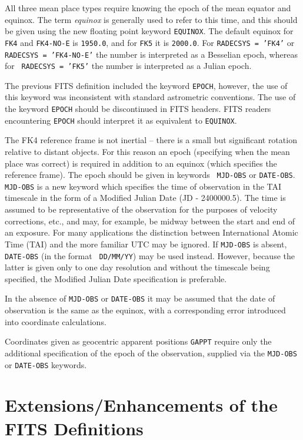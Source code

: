 All three mean place types require knowing the epoch of the mean equator and
equinox.  The term {\it equinox} is generally used to refer to this time, and
this should be given using the new floating point keyword {\tt EQUINOX}. The
default equinox for {\tt FK4} and {\tt FK4-NO-E} is {\tt 1950.0}, and for 
{\tt FK5} it is {\tt 2000.0}. For {\tt RADECSYS = 'FK4'} or {\tt RADECSYS =
'FK4-NO-E'} the number is interpreted as a Besselian epoch, whereas for {\tt
RADECSYS = 'FK5'} the number is interpreted as a Julian epoch. 

The previous FITS definition included the keyword {\tt EPOCH}, however, the use
of this keyword was inconsistent with standard astrometric conventions. The use
of the keyword {\tt EPOCH} should be discontinued in FITS headers.  FITS
readers encountering {\tt EPOCH} should interpret it as
equivalent to {\tt EQUINOX}. 

The FK4 reference frame is not inertial -- there is a small but significant
rotation relative to distant objects.  For this reason an epoch (specifying
when the mean place was correct) is required in addition to an equinox (which
specifies the reference frame). The epoch should be given in keywords {\tt
MJD-OBS} or {\tt DATE-OBS}.  {\tt MJD-OBS} is a new keyword which specifies the
time of observation in the TAI timescale in the form of a Modified Julian Date
(JD - 2400000.5). The time is assumed to be representative of the observation
for the purposes of velocity corrections, etc., and may, for example, be midway
between the start and end of an exposure.  For many applications the 
distinction between International Atomic Time (TAI) and the more familiar UTC
may be ignored. If {\tt MJD-OBS} is absent, {\tt DATE-OBS} (in the format {\tt
DD/MM/YY}) may be used instead.  However, because the latter is given only to 
one day resolution and without the timescale being specified, the Modified
Julian Date specification is preferable.

In the absence of {\tt MJD-OBS} or {\tt DATE-OBS} it may be assumed that the
date of observation is the same as the equinox, with a corresponding error
introduced into coordinate calculations. 

Coordinates given as geocentric apparent positions {\tt GAPPT} require only
the additional specification of the epoch of the observation, supplied
via the {\tt MJD-OBS} or {\tt DATE-OBS} keywords.


\section{Extensions/Enhancements of the FITS Definitions}

